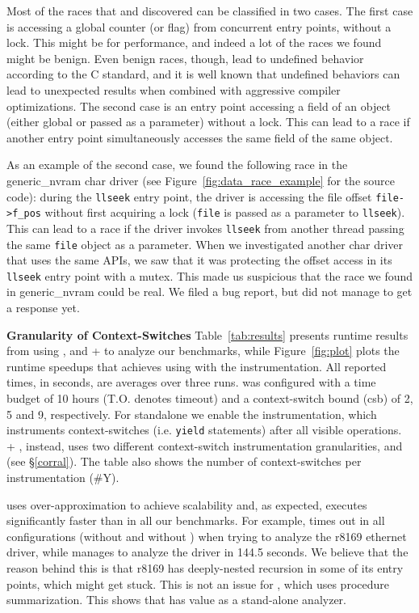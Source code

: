 Most of the races that \whoop and \corral discovered can be classified in two cases. The first case is accessing a global counter (or flag) from concurrent entry points, without a lock. This might be for performance, and indeed a lot of the races we found might be benign. Even benign races, though, lead to undefined behavior according to the C standard, and it is well known that undefined behaviors can lead to unexpected results when combined with aggressive compiler optimizations. The second case is an entry point accessing a field of an object (either global or passed as a parameter) without a lock. This can lead to a race if another entry point simultaneously accesses the same field of the same object.

As an example of the second case, we found the following race in the generic\_nvram char driver (see Figure~\ref{fig:data_race_example} for the source code): during the \texttt{llseek} entry point, the driver is accessing the file offset \texttt{file->f\_pos} without first acquiring a lock (\texttt{file} is passed as a parameter to \texttt{llseek}). This can lead to a race if the driver invokes \texttt{llseek} from another thread passing the same \texttt{file} object as a parameter. When we investigated another char driver that uses the same APIs, we saw that it was protecting the offset access in its \texttt{llseek} entry point with a mutex. This made us suspicious that the race we found in generic\_nvram could be real. We filed a bug report, but did not manage to get a response yet.

\noindent\textbf{Granularity of Context-Switches }
%
Table~\ref{tab:results} presents runtime results from using \whoop, \corral and \whoop + \corral to analyze our benchmarks, while Figure~\ref{fig:plot} plots the runtime speedups that \corral achieves using \whoop with the \yieldmr instrumentation. All reported times, in seconds, are averages over three runs. \corral was configured with a time budget of 10 hours (T.O. denotes timeout) and a context-switch bound (csb) of 2, 5 and 9, respectively. For standalone \corral we enable the \yieldall instrumentation, which instruments context-switches (i.e. \texttt{yield} statements) after all visible operations. \whoop + \corral, instead, uses two different context-switch instrumentation granularities, \yieldcoarse and \yieldmr (see \S\ref{corral}). The table also shows the number of context-switches per instrumentation (\#Y).

\whoop uses over-approximation to achieve scalability and, as expected, executes significantly faster than \corral in all our benchmarks. For example, \corral times out in all configurations (without and without \whoop) when trying to analyze the r8169 ethernet driver, while \whoop manages to analyze the driver in 144.5 seconds. We believe that the reason behind this is that r8169 has deeply-nested recursion in some of its entry points, which might get \corral stuck. This is not an issue for \whoop, which uses procedure summarization. This shows that \whoop has value as a stand-alone analyzer.

